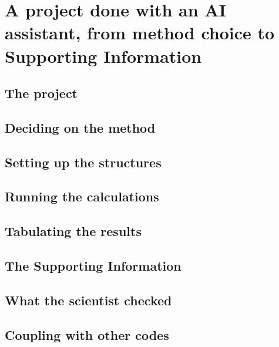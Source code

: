 \chapter{A project done with an AI assistant, from method choice to Supporting Information}
\label{ch:ai-project}



\section{The project}

\section{Deciding on the method}

\section{Setting up the structures}

\section{Running the calculations}

\section{Tabulating the results}

\section{The Supporting Information}

\section{What the scientist checked}

\section{Coupling with other codes}

